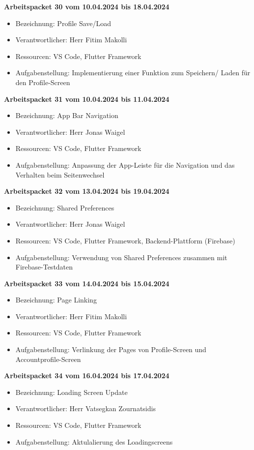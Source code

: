 \textbf{Arbeitspacket 30 vom 10.04.2024 bis 18.04.2024}
\begin{itemize}[itemsep=0pt]
    \item{Bezeichnung: Profile Save/Load} 
	\item{Verantwortlicher: Herr Fitim Makolli} 
	\item{Ressourcen: VS Code, Flutter Framework} 
    \item{Aufgabenstellung: Implementierung einer Funktion zum Speichern/ Laden für den Profile-Screen}
\end{itemize}

\textbf{Arbeitspacket 31 vom 10.04.2024 bis 11.04.2024}
\begin{itemize}[itemsep=0pt]
    \item{Bezeichnung: App Bar Navigation} 
	\item{Verantwortlicher: Herr Jonas Waigel} 
	\item{Ressourcen: VS Code, Flutter Framework} 
    \item{Aufgabenstellung: Anpassung der App-Leiste für die Navigation und das Verhalten beim Seitenwechsel}
\end{itemize} 

\textbf{Arbeitspacket 32 vom 13.04.2024 bis 19.04.2024}
\begin{itemize}[itemsep=0pt]
    \item{Bezeichnung: Shared Preferences} 
	\item{Verantwortlicher: Herr Jonas Waigel} 
	\item{Ressourcen: VS Code, Flutter Framework, Backend-Plattform (Firebase)}
    \item{Aufgabenstellung: Verwendung von Shared Preferences zusammen mit Firebase-Testdaten} 
\end{itemize}

\newpage
\textbf{Arbeitspacket 33 vom 14.04.2024 bis 15.04.2024}
\begin{itemize}[itemsep=0pt]
    \item{Bezeichnung: Page Linking} 
	\item{Verantwortlicher: Herr Fitim Makolli} 
	\item{Ressourcen: VS Code, Flutter Framework} 
    \item{Aufgabenstellung: Verlinkung der Pages von Profile-Screen und Accountprofile-Screen}
\end{itemize}

\textbf{Arbeitspacket 34 vom 16.04.2024 bis 17.04.2024}
\begin{itemize}[itemsep=0pt]
    \item{Bezeichnung: Loading Screen Update} 
	\item{Verantwortlicher: Herr Vatsegkan Zournatsidis} 
	\item{Ressourcen: VS Code, Flutter Framework} 
    \item{Aufgabenstellung: Aktulalierung des Loadingscreens}
\end{itemize} 

